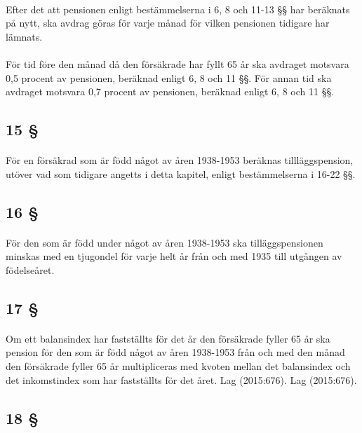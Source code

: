 \documentclass[a4paper,notitlepage,openany,10pt]{book}
\begin{document}
\paragraph*{}
Efter det att pensionen enligt bestämmelserna i 6, 8 och 11-13 §§ har beräknats på nytt, ska avdrag göras för varje månad för vilken pensionen tidigare har lämnats.
\paragraph*{}
För tid före den månad då den försäkrade har fyllt 65 år ska avdraget motsvara 0,5 procent av pensionen, beräknad enligt 6, 8 och 11 §§. För annan tid ska avdraget motsvara 0,7 procent av pensionen, beräknad enligt 6, 8 och 11 §§.
\subsection*{15 §}
\paragraph*{}
För en försäkrad som är född något av åren 1938-1953 beräknas tillläggspension, utöver vad som tidigare angetts i detta kapitel, enligt bestämmelserna i 16-22 §§.
\subsection*{16 §}
\paragraph*{}
För den som är född under något av åren 1938-1953 ska tilläggspensionen minskas med en tjugondel för varje helt år från och med 1935 till utgången av födelseåret.
\subsection*{17 §}
\paragraph*{}
Om ett balansindex har fastställts för det år den försäkrade fyller 65 år ska pension för den som är född något av åren 1938-1953 från och med den månad den försäkrade fyller 65 år multipliceras med kvoten mellan det balansindex och det inkomstindex som har fastställts för det året.
Lag (2015:676).
Lag (2015:676).
\subsection*{18 §}
\end{document}
